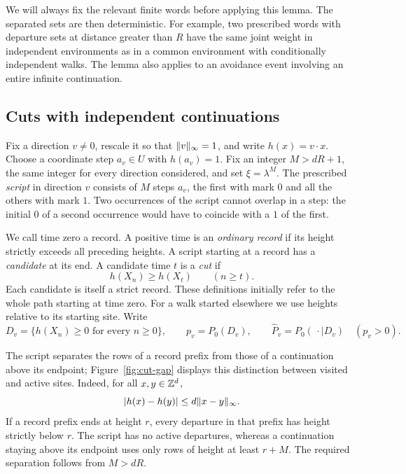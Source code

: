 We will always fix the relevant finite words before applying this
lemma.  The separated sets are then deterministic.  For example, two
prescribed words with departure sets at distance greater than \(R\)
have the same joint weight in independent environments as in a common
environment with conditionally independent walks.  The lemma also
applies to an avoidance event involving an entire infinite continuation.

\subsection{Cuts with independent continuations}

Fix a direction \(v\ne0\), rescale it so that
\(\lVert v\rVert_\infty=1\), and write \(h(x)=v\cdot x\).  Choose a
coordinate step \(a_v\in U\) with \(h(a_v)=1\).  Fix an integer
\(M>dR+1\), the same integer for every direction considered, and set
\(\xi=\lambda^M\).  The prescribed \emph{script} in direction \(v\)
consists of \(M\) steps \(a_v\), the first with mark \(0\) and all
the others with mark \(1\).  Two occurrences of the script cannot
overlap in a step: the initial \(0\) of a second occurrence would have
to coincide with a \(1\) of the first.

We call time zero a record.  A positive time is an \emph{ordinary
record} if its height strictly exceeds all preceding heights.  A script
starting at a record has a \emph{candidate} at its end.  A candidate
time \(t\) is a \emph{cut} if
\[
 h(X_n)\ge h(X_t)\qquad(n\ge t).
\]
Each candidate is itself a strict record.  These definitions initially
refer to the whole path starting at time zero.  For a walk started
elsewhere we use heights relative to its starting site.  Write
\[
 D_v=\{h(X_n)\ge0\text{ for every }n\ge0\},\qquad
 p_v=P_0(D_v),\qquad
 \widehat P_v=P_0(\,\cdot\mid D_v)\quad(p_v>0).
\]

The script separates the rows of a record prefix from those of a
continuation above its endpoint; Figure~\ref{fig:cut-gap} displays this
distinction between visited and active sites.  Indeed, for all
\(x,y\in\mathbb Z^d\),
\begin{equation}\label{eq:height-distance}
 |h(x)-h(y)|\le d\lVert x-y\rVert_\infty.
\end{equation}
If a record prefix ends at height \(r\), every departure in that
prefix has height strictly below \(r\).  The script has no active
departures, whereas a continuation staying above its endpoint uses
only rows of height at least \(r+M\).  The required separation follows
from \(M>dR\).

